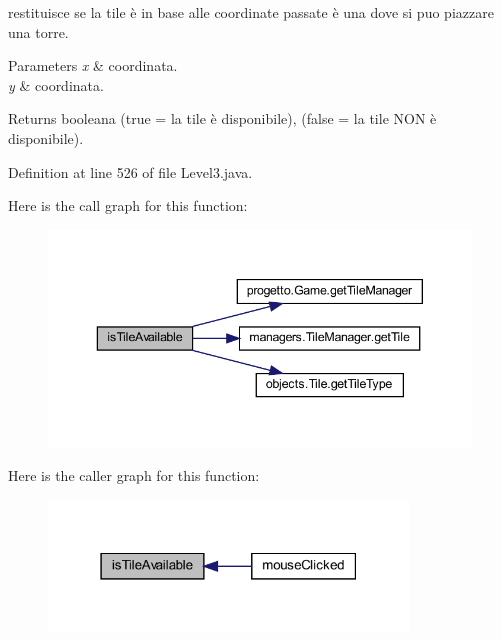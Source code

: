 restituisce se la tile è in base alle coordinate passate è una dove si puo piazzare una torre. 


\begin{DoxyParams}{Parameters}
{\em x} & coordinata. \\
\hline
{\em y} & coordinata.\\
\hline
\end{DoxyParams}
\begin{DoxyReturn}{Returns}
booleana (true = la tile è disponibile), (false = la tile N\+ON è disponibile). 
\end{DoxyReturn}


Definition at line 526 of file Level3.\+java.

Here is the call graph for this function\+:\nopagebreak
\begin{figure}[H]
\begin{center}
\leavevmode
\includegraphics[width=343pt]{classscenes_1_1_level3_aaeac2ee6b3a920a21928ee7b3dc8e7a9_cgraph}
\end{center}
\end{figure}
Here is the caller graph for this function\+:\nopagebreak
\begin{figure}[H]
\begin{center}
\leavevmode
\includegraphics[width=271pt]{classscenes_1_1_level3_aaeac2ee6b3a920a21928ee7b3dc8e7a9_icgraph}
\end{center}
\end{figure}
\mbox{\label{classscenes_1_1_level3_ab68417e6738c05037923f5f0f21eb586}} 
